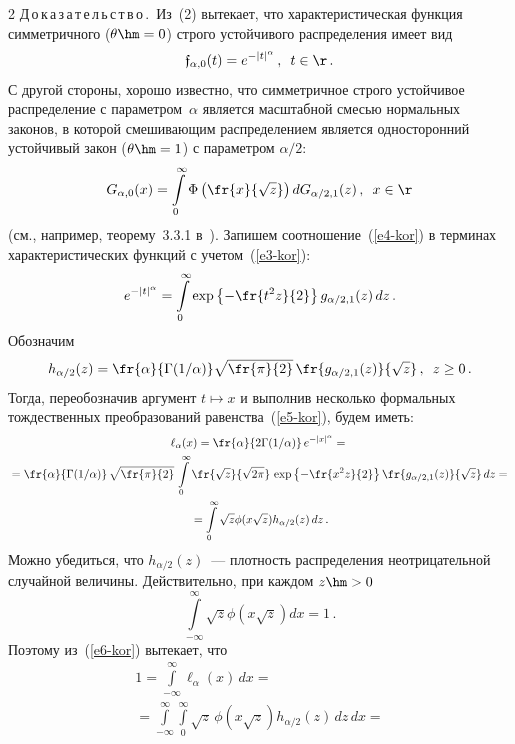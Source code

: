 \begin{multicols}{2}
\noindent
Д\,о\,к\,а\,з\,а\,т\,е\,л\,ь\,с\,т\,в\,о\,.\ Из~(2) вытекает, что характеристическая
функция симметричного ($\theta\hm=0$) строго устойчивого распределения
имеет вид
\begin{equation}
\mathfrak{f}_{\alpha,0}(t)=e^{-|t|^{\alpha}}\,,\enskip t\in\r\,. \label{e3-kor}
\end{equation}
С другой стороны, хорошо известно, что сим\-мет\-рич\-ное строго
устойчивое распределение с па\-ра\-мет\-ром~$\alpha$ является мас\-штаб\-ной
смесью нормальных законов, в которой смешивающим распределением
является односторонний устойчивый закон ($\theta\hm=1$) с параметром
$\alpha/2$:
\begin{equation}
G_{\alpha,0}(x)=\int\limits_{0}^{\infty}\Phi\left(\fr{x}{\sqrt{z}}\right)dG_{\alpha/2,1}(z)\,,\enskip
x\in\r\label{e4-kor}
\end{equation}
(см., например, теорему~3.3.1 в~\cite{Zolotarev1983}). Запишем
соотношение~(\ref{e4-kor}) в терминах характеристических функций с учетом~(\ref{e3-kor}):
\begin{equation}
e^{-|t|^{\alpha}}=\int\limits_0^{\infty}\exp\left\{-\fr{t^2z}{2}\right\}g_{\alpha/2,1}(z)\,dz\,.
\label{e5-kor}
\end{equation}
Обозначим
$$
h_{\alpha/2}(z)=\fr{\alpha}{\Gamma({1}/{\alpha})}\sqrt{\fr{\pi}{2}}\,
\fr{g_{\alpha/2,1}(z)}{\sqrt{z}}\,,\enskip
z\ge0\,.
$$
Тогда, переобозначив аргумент $t\mapsto x$ и выполнив несколько
формальных тождественных преобразований равенства~(\ref{e5-kor}), будем иметь:
\begin{multline}
\ell_{\alpha}(x)=\fr{\alpha}{2\Gamma({1}/{\alpha})}\,e^{-|x|^{\alpha}}={}\\
{}=
\fr{\alpha}{\Gamma({1}/{\alpha})}\,\sqrt{\fr{\pi}{2}}\,\int\limits_0^{\infty}
\fr{\sqrt{z}}{\sqrt{2\pi}}\,\exp\left\{-\fr{x^2z}{2}\right\}\fr{g_{\alpha/2,1}(z)}{\sqrt{z}}\,dz
={}\\
{}=\int\limits_0^{\infty}\sqrt{z}\phi(x\sqrt{z})h_{\alpha/2}(z)\,dz\,.\label{e6-kor}
\end{multline}
Можно убедиться, что $h_{\alpha/2}(z)$~--- плотность распределения
неотрицательной случайной величины. Действительно,
при каждом $z\hm>0$
$$
\int\limits_{-\infty}^{\infty}\sqrt{z}\phi\left(x\sqrt{z}\right)dx=1\,.
$$
Поэтому из~(\ref{e6-kor}) вытекает, что
\begin{multline*}
1=\int\limits_{-\infty}^{\infty}\ell_{\alpha}(x)\,dx={}\\
{}=
\int\limits_{-\infty}^{\infty}\int\limits_{0}^{\infty}\sqrt{z}\,\phi(x\sqrt{z})h_{\alpha/2}(z)\,dz\,dx=

\end{multline*}
\end{multicols}
